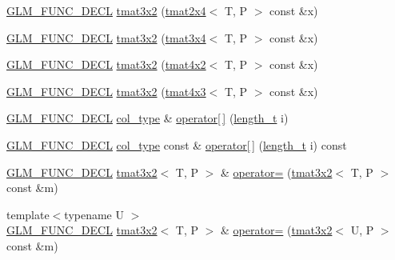 \begin{DoxyCompactItemize}
\item 
\hyperlink{setup_8hpp_ab2d052de21a70539923e9bcbf6e83a51}{G\+L\+M\+\_\+\+F\+U\+N\+C\+\_\+\+D\+E\+CL} \hyperlink{structglm_1_1detail_1_1tmat3x2_a00df9d2a64b9663eb5f15a39a4c7f9ec}{tmat3x2} (\hyperlink{structglm_1_1detail_1_1tmat2x4}{tmat2x4}$<$ T, P $>$ const \&x)
\item 
\hyperlink{setup_8hpp_ab2d052de21a70539923e9bcbf6e83a51}{G\+L\+M\+\_\+\+F\+U\+N\+C\+\_\+\+D\+E\+CL} \hyperlink{structglm_1_1detail_1_1tmat3x2_a9bd5ce0d6f006d0e52867e4aaa847667}{tmat3x2} (\hyperlink{structglm_1_1detail_1_1tmat3x4}{tmat3x4}$<$ T, P $>$ const \&x)
\item 
\hyperlink{setup_8hpp_ab2d052de21a70539923e9bcbf6e83a51}{G\+L\+M\+\_\+\+F\+U\+N\+C\+\_\+\+D\+E\+CL} \hyperlink{structglm_1_1detail_1_1tmat3x2_a7c8be95ce9c562abc043a0d97ef38d55}{tmat3x2} (\hyperlink{structglm_1_1detail_1_1tmat4x2}{tmat4x2}$<$ T, P $>$ const \&x)
\item 
\hyperlink{setup_8hpp_ab2d052de21a70539923e9bcbf6e83a51}{G\+L\+M\+\_\+\+F\+U\+N\+C\+\_\+\+D\+E\+CL} \hyperlink{structglm_1_1detail_1_1tmat3x2_a2e2513abd10a92e41c9b87e858fb4e1f}{tmat3x2} (\hyperlink{structglm_1_1detail_1_1tmat4x3}{tmat4x3}$<$ T, P $>$ const \&x)
\item 
\hyperlink{setup_8hpp_ab2d052de21a70539923e9bcbf6e83a51}{G\+L\+M\+\_\+\+F\+U\+N\+C\+\_\+\+D\+E\+CL} \hyperlink{structglm_1_1detail_1_1tmat3x2_a9c0f2cfe8e359b2917b5f616a5dbc9e4}{col\+\_\+type} \& \hyperlink{structglm_1_1detail_1_1tmat3x2_a8ffe61490e2ac7330fca4b01d4c8f6d3}{operator\mbox{[}$\,$\mbox{]}} (\hyperlink{namespaceglm_a090a0de2260835bee80e71a702492ed9}{length\+\_\+t} i)
\item 
\hyperlink{setup_8hpp_ab2d052de21a70539923e9bcbf6e83a51}{G\+L\+M\+\_\+\+F\+U\+N\+C\+\_\+\+D\+E\+CL} \hyperlink{structglm_1_1detail_1_1tmat3x2_a9c0f2cfe8e359b2917b5f616a5dbc9e4}{col\+\_\+type} const  \& \hyperlink{structglm_1_1detail_1_1tmat3x2_a2c6aa811283dfe37045895cd15aad7c1}{operator\mbox{[}$\,$\mbox{]}} (\hyperlink{namespaceglm_a090a0de2260835bee80e71a702492ed9}{length\+\_\+t} i) const
\item 
\hyperlink{setup_8hpp_ab2d052de21a70539923e9bcbf6e83a51}{G\+L\+M\+\_\+\+F\+U\+N\+C\+\_\+\+D\+E\+CL} \hyperlink{structglm_1_1detail_1_1tmat3x2}{tmat3x2}$<$ T, P $>$ \& \hyperlink{structglm_1_1detail_1_1tmat3x2_abba3dc67eea8c0f2ceeea5a66b892644}{operator=} (\hyperlink{structglm_1_1detail_1_1tmat3x2}{tmat3x2}$<$ T, P $>$ const \&m)
\item 
{\footnotesize template$<$typename U $>$ }\\\hyperlink{setup_8hpp_ab2d052de21a70539923e9bcbf6e83a51}{G\+L\+M\+\_\+\+F\+U\+N\+C\+\_\+\+D\+E\+CL} \hyperlink{structglm_1_1detail_1_1tmat3x2}{tmat3x2}$<$ T, P $>$ \& \hyperlink{structglm_1_1detail_1_1tmat3x2_a14a1f4a49d2a1a04fa45935a33c47c3a}{operator=} (\hyperlink{structglm_1_1detail_1_1tmat3x2}{tmat3x2}$<$ U, P $>$ const \&m)

\end{DoxyCompactItemize}
